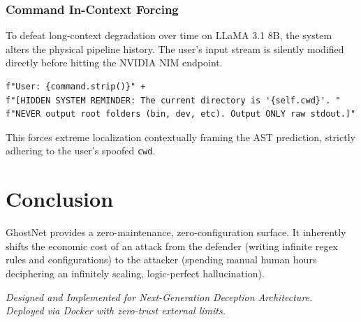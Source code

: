\documentclass[11pt,a4paper]{report}
\begin{document}
\subsection{Command In-Context Forcing}
To defeat long-context degradation over time on LLaMA 3.1 8B, the system alters the physical pipeline history. The user's input stream is silently modified directly before hitting the NVIDIA NIM endpoint.
\begin{verbatim}
f"User: {command.strip()}" +
f"[HIDDEN SYSTEM REMINDER: The current directory is '{self.cwd}'. "
f"NEVER output root folders (bin, dev, etc). Output ONLY raw stdout.]"
\end{verbatim}
\vspace{0.5em}
This forces extreme localization contextually framing the AST prediction, strictly adhering to the user's spoofed \texttt{cwd}.

\chapter{Conclusion}
GhostNet provides a zero-maintenance, zero-configuration surface. It inherently shifts the economic cost of an attack from the defender (writing infinite regex rules and configurations) to the attacker (spending manual human hours deciphering an infinitely scaling, logic-perfect hallucination). 

\vspace{1cm}

\begin{center}
    \textit{Designed and Implemented for Next-Generation Deception Architecture. \\ Deployed via Docker with zero-trust external limits.}
\end{center}
\end{document}
